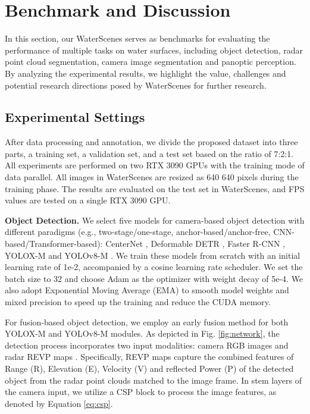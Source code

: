 \documentclass[lettersize,journal]{IEEEtran}
\begin{document}
\section{Benchmark and Discussion}
\label{sec:Benchmark}

In this section, our WaterScenes serves as benchmarks for evaluating the performance of multiple tasks on water surfaces, including object detection, radar point cloud segmentation, camera image segmentation and panoptic perception. By analyzing the experimental results, we highlight the value, challenges and potential research directions posed by WaterScenes for further research.

\subsection{Experimental Settings}

After data processing and annotation, we divide the proposed dataset into three parts, a training set, a validation set, and a test set based on the ratio of 7:2:1. All experiments are performed on two RTX 3090 GPUs with the training mode of data parallel. All images in WaterScenes are resized as 640  640 pixels during the training phase. The results are evaluated on the test set in WaterScenes, and FPS values are tested on a single RTX 3090 GPU.

\textbf{Object Detection.} We select five models for camera-based object detection with different paradigms (e.g., two-stage/one-stage, anchor-based/anchor-free, CNN-based/Transformer-based): CenterNet \cite{zhou2019objects}, Deformable DETR \cite{zhu2020deformable}, Faster R-CNN \cite{girshick2015fast},  YOLOX-M \cite{ge2021yolox} and YOLOv8-M \cite{yolov8}. We train these models from scratch with an initial learning rate of 1e-2, accompanied by a cosine learning rate scheduler. We set the batch size to 32 and choose Adam as the optimizer with weight decay of 5e-4. We also adopt Exponential Moving Average (EMA) to smooth model weights and mixed precision to speed up the training and reduce the CUDA memory.
 
For fusion-based object detection, we employ an early fusion method for both YOLOX-M and YOLOv8-M modules. As depicted in Fig. \ref{fig:network}, the detection process incorporates two input modalities: camera RGB images  and radar REVP maps . Specifically, REVP maps capture the combined features of Range (R), Elevation (E), Velocity (V) and reflected Power (P) of the detected object from the radar point clouds matched to the image frame. 
In stem layers of the camera input, we utilize a CSP block \cite{ge2021yolox} to process the image features, as denoted by Equation \ref{eq:csp}. 
\end{document}
